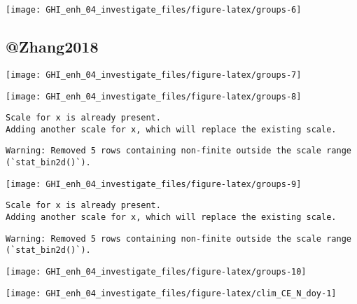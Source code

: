 \documentclass[
  10pt,
  a4paper,oneside]{article}
\begin{document}
\begin{center}\texttt{[image: GHI\_enh\_04\_investigate\_files/figure-latex/groups-6]} \end{center}

\hypertarget{zhang2018}{%
\subsection{@Zhang2018}\label{zhang2018}}

\begin{center}\texttt{[image: GHI\_enh\_04\_investigate\_files/figure-latex/groups-7]} \end{center}

\begin{center}\texttt{[image: GHI\_enh\_04\_investigate\_files/figure-latex/groups-8]} \end{center}

\begin{verbatim}
Scale for x is already present.
Adding another scale for x, which will replace the existing scale.
\end{verbatim}

\begin{verbatim}
Warning: Removed 5 rows containing non-finite outside the scale range
(`stat_bin2d()`).
\end{verbatim}

\begin{center}\texttt{[image: GHI\_enh\_04\_investigate\_files/figure-latex/groups-9]} \end{center}

\begin{verbatim}
Scale for x is already present.
Adding another scale for x, which will replace the existing scale.
\end{verbatim}

\begin{verbatim}
Warning: Removed 5 rows containing non-finite outside the scale range
(`stat_bin2d()`).
\end{verbatim}

\begin{center}\texttt{[image: GHI\_enh\_04\_investigate\_files/figure-latex/groups-10]} \end{center}

\begin{center}\texttt{[image: GHI\_enh\_04\_investigate\_files/figure-latex/clim\_CE\_N\_doy-1]} \end{center}
\end{document}

